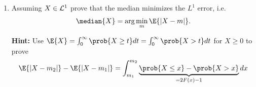 \begin{exercise}[subtitle={Median -- Projection in \(L^1\) \Coffeecup\Coffeecup}]
\begin{enumerate}[label=(\alph*), noitemsep]
		\item\label{it: (median) projection in L1}
        Assuming \(X\in \mathcal{L}^1\) prove that the median minimizes the \(L^1\) error, i.e.
        \[
            \median{X} =\arg\min_{m} \E{\abs{X-m}}.
        \]

 		\textbf{Hint:}
            Use \(\E{X}=\int_0^\infty \prob{X\ge t}dt = \int_0^\infty \prob{X>t}dt\)
            for \(X\ge 0\) to prove
            \[
                \E{\abs{X-m_2}} - \E{\abs{X-m_1}}
                = \int_{m_1}^{m_2} \underbrace{\prob{X\le x} - \prob{X>x}}_{=2F(x)-1}dx
            \]
	\end{enumerate}
\end{exercise}

